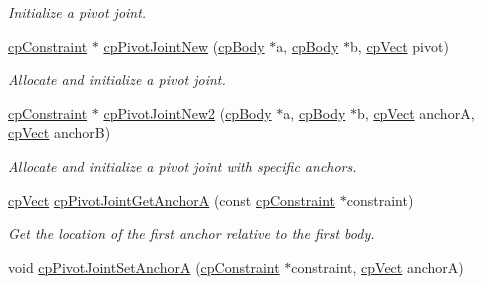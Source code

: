 \begin{DoxyCompactItemize}
\begin{DoxyCompactList}\small\item\em Initialize a pivot joint. \end{DoxyCompactList}\item 
\hypertarget{group__cp_pivot_joint_ga56d3fd371a5f4688abcf0c279ad77a9d}{}\hyperlink{structcp_constraint}{cp\+Constraint} $\ast$ \hyperlink{group__cp_pivot_joint_ga56d3fd371a5f4688abcf0c279ad77a9d}{cp\+Pivot\+Joint\+New} (\hyperlink{structcp_body}{cp\+Body} $\ast$a, \hyperlink{structcp_body}{cp\+Body} $\ast$b, \hyperlink{structcp_vect}{cp\+Vect} pivot)\label{group__cp_pivot_joint_ga56d3fd371a5f4688abcf0c279ad77a9d}

\begin{DoxyCompactList}\small\item\em Allocate and initialize a pivot joint. \end{DoxyCompactList}\item 
\hypertarget{group__cp_pivot_joint_gafbd0cc0e3c7b16598490be80060166c1}{}\hyperlink{structcp_constraint}{cp\+Constraint} $\ast$ \hyperlink{group__cp_pivot_joint_gafbd0cc0e3c7b16598490be80060166c1}{cp\+Pivot\+Joint\+New2} (\hyperlink{structcp_body}{cp\+Body} $\ast$a, \hyperlink{structcp_body}{cp\+Body} $\ast$b, \hyperlink{structcp_vect}{cp\+Vect} anchor\+A, \hyperlink{structcp_vect}{cp\+Vect} anchor\+B)\label{group__cp_pivot_joint_gafbd0cc0e3c7b16598490be80060166c1}

\begin{DoxyCompactList}\small\item\em Allocate and initialize a pivot joint with specific anchors. \end{DoxyCompactList}\item 
\hypertarget{group__cp_pivot_joint_gae9ae0590413b869b2d1084697e34d828}{}\hyperlink{structcp_vect}{cp\+Vect} \hyperlink{group__cp_pivot_joint_gae9ae0590413b869b2d1084697e34d828}{cp\+Pivot\+Joint\+Get\+Anchor\+A} (const \hyperlink{structcp_constraint}{cp\+Constraint} $\ast$constraint)\label{group__cp_pivot_joint_gae9ae0590413b869b2d1084697e34d828}

\begin{DoxyCompactList}\small\item\em Get the location of the first anchor relative to the first body. \end{DoxyCompactList}\item 
\hypertarget{group__cp_pivot_joint_ga2a358a7ce43fe8cb8196d88160eba90f}{}void \hyperlink{group__cp_pivot_joint_ga2a358a7ce43fe8cb8196d88160eba90f}{cp\+Pivot\+Joint\+Set\+Anchor\+A} (\hyperlink{structcp_constraint}{cp\+Constraint} $\ast$constraint, \hyperlink{structcp_vect}{cp\+Vect} anchor\+A)\label{group__cp_pivot_joint_ga2a358a7ce43fe8cb8196d88160eba90f}


\end{DoxyCompactItemize}
